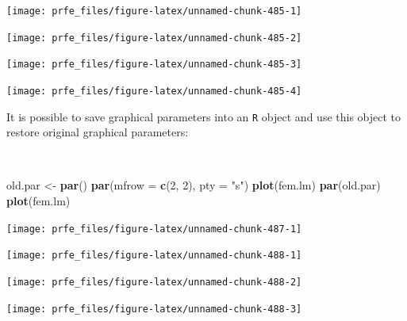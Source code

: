 \documentclass[12pt,a4paper]{book}
\newenvironment{Shaded}{\begin{snugshade}}{\end{snugshade}}
\newcommand{\DataTypeTok}[1]{\textcolor[rgb]{0.13,0.29,0.53}{#1}}
\newcommand{\DecValTok}[1]{\textcolor[rgb]{0.00,0.00,0.81}{#1}}
\newcommand{\KeywordTok}[1]{\textcolor[rgb]{0.13,0.29,0.53}{\textbf{#1}}}
\newcommand{\NormalTok}[1]{#1}
\newcommand{\StringTok}[1]{\textcolor[rgb]{0.31,0.60,0.02}{#1}}
\theoremstyle{definition}
\theoremstyle{definition}
\theoremstyle{definition}
\theoremstyle{remark}
\begin{document}
\newpage

\begin{center}\texttt{[image: prfe\_files/figure-latex/unnamed-chunk-485-1]} \end{center}

\begin{center}\texttt{[image: prfe\_files/figure-latex/unnamed-chunk-485-2]} \end{center}

\begin{center}\texttt{[image: prfe\_files/figure-latex/unnamed-chunk-485-3]} \end{center}

\begin{center}\texttt{[image: prfe\_files/figure-latex/unnamed-chunk-485-4]} \end{center}

\newpage

It is possible to save graphical parameters into an \texttt{R} object
and use this object to restore original graphical parameters:

~

\begin{Shaded}
\begin{Highlighting}[]
\NormalTok{old.par <-}\StringTok{ }\KeywordTok{par}\NormalTok{()}
\KeywordTok{par}\NormalTok{(}\DataTypeTok{mfrow =} \KeywordTok{c}\NormalTok{(}\DecValTok{2}\NormalTok{, }\DecValTok{2}\NormalTok{), }\DataTypeTok{pty =} \StringTok{"s"}\NormalTok{)}
\KeywordTok{plot}\NormalTok{(fem.lm)}
\KeywordTok{par}\NormalTok{(old.par)}
\KeywordTok{plot}\NormalTok{(fem.lm)}
\end{Highlighting}
\end{Shaded}

\begin{center}\texttt{[image: prfe\_files/figure-latex/unnamed-chunk-487-1]} \end{center}

\newpage

\begin{center}\texttt{[image: prfe\_files/figure-latex/unnamed-chunk-488-1]} \end{center}

\begin{center}\texttt{[image: prfe\_files/figure-latex/unnamed-chunk-488-2]} \end{center}

\begin{center}\texttt{[image: prfe\_files/figure-latex/unnamed-chunk-488-3]} \end{center}
\end{document}
